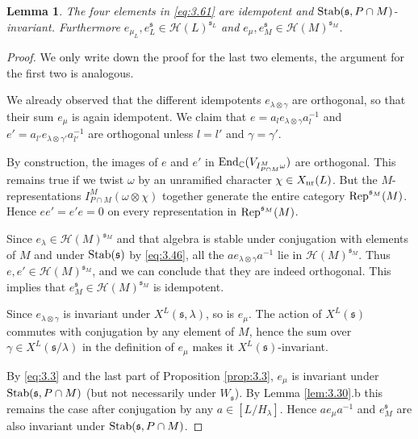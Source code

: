 \documentclass[11pt]{amsart}
\newtheorem{lem}[thm]{Lemma}
\theoremstyle{definition}
\begin{document}
\begin{lem}\label{lem:3.2}
The four elements in \eqref{eq:3.61} are idempotent and ${{\rm Stab}} ({{\mathfrak s}},P \cap M)$-invariant.
Furthermore $e_{\mu_L}, e^{{\mathfrak s}}_L \in {{\mathcal H}} (L)^{{{\mathfrak s}}_L}$ and $e_\mu, e^{{\mathfrak s}}_M \in {{\mathcal H}} (M)^{{{\mathfrak s}}_M}$.
\end{lem}
\begin{proof}
We only write down the proof for the last two elements, the argument for the first two
is analogous.

We already observed that the different idempotents $e_{\lambda \otimes \gamma}$ are
orthogonal, so that their sum $e_{\mu}$ is again idempotent. We claim that 
$e = a_l e_{\lambda \otimes \gamma} a_l^{-1}$ and $e' = a_{l'} e_{\lambda \otimes 
\gamma'} a_{l'}^{-1}$ are orthogonal unless $l = l'$ and $\gamma = \gamma'$. 

By construction, the images
of $e$ and $e'$ in ${{\rm End}}_{\mathbb C} ( V_{I_{P \cap M}^M \omega} )$ are orthogonal. This remains 
true if we twist $\omega$ by an unramified character $\chi \in X_{{\rm nr}} (L)$. But the 
$M$-representations $I_{P \cap M}^M (\omega \otimes \chi)$ together generate the entire 
category ${{\rm Rep}}^{{{\mathfrak s}}_M}(M)$. Hence $e e' = e' e = 0$ on every representation in 
${{\rm Rep}}^{{{\mathfrak s}}_M}(M)$. 

Since $e_\lambda \in {{\mathcal H}} (M)^{{{\mathfrak s}}_M}$ and that algebra is stable under conjugation with
elements of $M$ and under ${{\rm Stab}} ({{\mathfrak s}})$ by 
\eqref{eq:3.46}, all the $a e_{\lambda \otimes \gamma} a^{-1}$ lie in ${{\mathcal H}} (M)^{{{\mathfrak s}}_M}$.
Thus $e,e' \in {{\mathcal H}} (M)^{{{\mathfrak s}}_M}$, and we can conclude that they are indeed
orthogonal. This implies that $e^{{\mathfrak s}}_M \in {{\mathcal H}} (M)^{{{\mathfrak s}}_M}$ is idempotent.

Since $e_{\lambda \otimes \gamma}$ is invariant under $X^L ({{\mathfrak s}},\lambda)$, so is 
$e_{\mu}$. The action of $X^L ({{\mathfrak s}})$ commutes with conjugation by any element of $M$, 
hence the sum over $\gamma \in X^L ({{\mathfrak s}} / \lambda)$ in the definition of $e_{\mu}$
makes it $X^L ({{\mathfrak s}})$-invariant. 

By \eqref{eq:3.3} and the last part of Proposition \ref{prop:3.3}, $e_{\mu}$ is 
invariant under ${{\rm Stab}} ({{\mathfrak s}},P \cap M)$ (but not necessarily under $W_{{\mathfrak s}}$). By Lemma 
\ref{lem:3.30}.b this remains the case after conjugation by any $a \in [L / H_\lambda]$.
Hence $a e_{\mu } a^{-1}$ and $e^{{\mathfrak s}}_M$ are also invariant under ${{\rm Stab}} ({{\mathfrak s}},P \cap M)$.
\end{proof}
\end{document}
